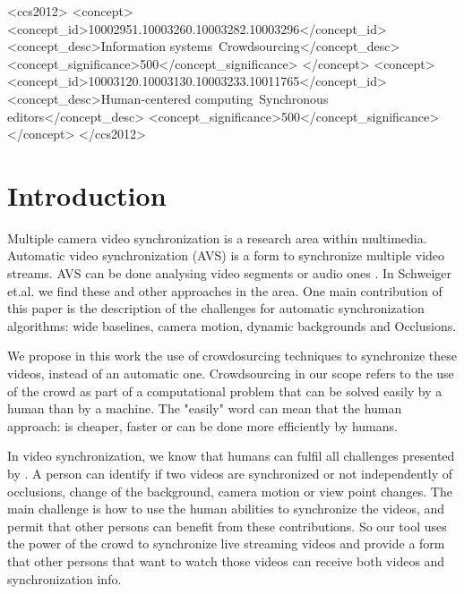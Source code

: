 \documentclass{sig-alternate-05-2015}
\begin{document}
%
%
 \begin{CCSXML}
<ccs2012>
	<concept>
		<concept_id>10002951.10003260.10003282.10003296</concept_id>
		<concept_desc>Information systems~Crowdsourcing</concept_desc>
		<concept_significance>500</concept_significance>
	</concept>
	<concept>
		<concept_id>10003120.10003130.10003233.10011765</concept_id>
		<concept_desc>Human-centered computing~Synchronous editors</concept_desc>
		<concept_significance>500</concept_significance>
	</concept>
</ccs2012>
\end{CCSXML}


\printccsdesc


\section{Introduction}
Multiple camera video synchronization is a research area within multimedia. Automatic video synchronization (AVS) is a form to synchronize multiple video streams. AVS can be done analysing video segments \cite{wang2014videosnapping} or audio ones \cite{su2012making}. In Schweiger et.al.\cite{schweiger2013fully} we find these and other approaches in the area. One main contribution of this paper is the description of the challenges for automatic synchronization algorithms: wide baselines, camera motion, dynamic backgrounds and Occlusions.

We propose in this work the use of crowdosurcing techniques to synchronize these videos, instead of an automatic one. Crowdsourcing \cite{howe2006rise} in our scope refers to the use of the crowd as part of a computational problem that can be solved easily by a human than by a machine. The "easily" word can mean that the human approach: is cheaper, faster or can be done more efficiently by humans.

In video synchronization, we know that humans can fulfil all challenges presented by \cite{schweiger2013fully}. A person can identify if two videos are synchronized or not independently of occlusions, change of the background, camera motion or view point changes. The main challenge is how to use the human abilities to synchronize the videos, and permit that other persons can benefit from these contributions. So our tool uses the power of the crowd to synchronize live streaming videos and provide a form that other persons that want to watch those videos can receive both videos and synchronization info.
\end{document}
